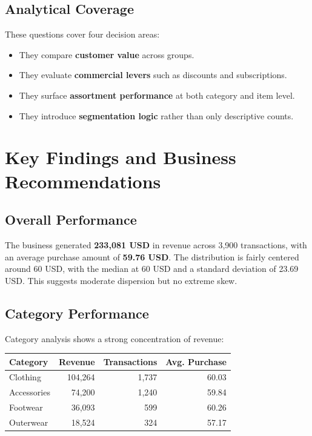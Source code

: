 \documentclass[12pt,a4paper]{article}
\begin{document}
\subsection{Analytical Coverage}
These questions cover four decision areas:
\begin{itemize}
  \item They compare \textbf{customer value} across groups.
  \item They evaluate \textbf{commercial levers} such as discounts and subscriptions.
  \item They surface \textbf{assortment performance} at both category and item level.
  \item They introduce \textbf{segmentation logic} rather than only descriptive counts.
\end{itemize}

\section{Key Findings and Business Recommendations}
\subsection{Overall Performance}
The business generated \textbf{233,081 USD} in revenue across 3,900 transactions, with an average purchase amount of \textbf{59.76 USD}. The distribution is fairly centered around 60 USD, with the median at 60 USD and a standard deviation of 23.69 USD. This suggests moderate dispersion but no extreme skew.

\subsection{Category Performance}
Category analysis shows a strong concentration of revenue:
\begin{center}
\begin{tabular}{lrrr}
\toprule
\textbf{Category} & \textbf{Revenue} & \textbf{Transactions} & \textbf{Avg. Purchase} \\
\midrule
Clothing & 104,264 & 1,737 & 60.03 \\
Accessories & 74,200 & 1,240 & 59.84 \\
Footwear & 36,093 & 599 & 60.26 \\
Outerwear & 18,524 & 324 & 57.17 \\
\bottomrule
\end{tabular}
\end{center}
\end{document}
